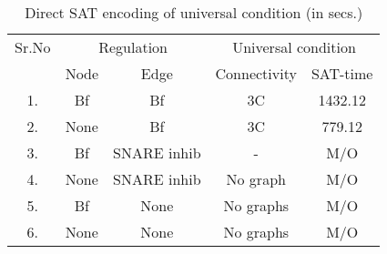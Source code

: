 \begin{table}[t]
	\centering
	    \def\arraystretch{1.1}
		\begin{tabular}[t]{c|c|c|c|c}\hline
			
			{\multirow{2}{*} {Sr.No}}  & \multicolumn{2}{c|}{Regulation} & \multicolumn{2}{c}{Universal condition} 
			
			

			
			\\\cline{2-5}
			{} & {Node} & {Edge} & {Connectivity} & {SAT-time} 
			
			\\\hline
			1. & Bf & Bf & 3C & 1432.12  \\\hline
			2. & None & Bf  & 3C & 779.12 \\\hline
			3. & Bf & SNARE inhib & - & M/O  \\\hline
			4. & None & SNARE inhib  & No graph & M/O\\\hline
			5. & Bf & None  & No graphs & M/O  \\\hline
			6. &  None & None  & No graphs & M/O \\\hline
			
	\end{tabular}
	\caption{ Direct SAT encoding of universal condition (in secs.)}
	\label{tab:satqbf-graph}
\end{table}